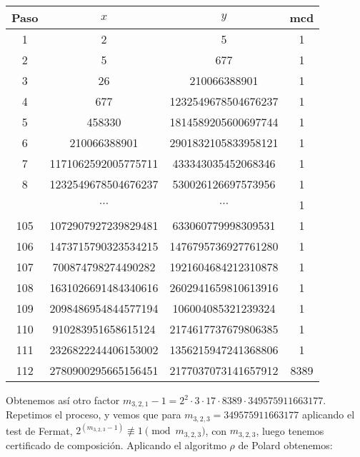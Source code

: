 \documentclass[fleqn]{article}
\begin{document}
    \begin{center}
        \begin{tabular}{| c | c | c | c |}
            \hline Paso & $x$ & $y$ & mcd \\ \hline
            1 & 2 & 5 & 1 \\
            2 & 5 & 677 & 1 \\
            3 & 26 & 210066388901 & 1 \\
            4 & 677 & 1232549678504676237 & 1 \\
            5 & 458330 & 1814589205600697744 & 1 \\
            6 & 210066388901 & 2901832105833958121 & 1 \\
            7 & 1171062592005775711 & 433343035452068346 & 1 \\
            8 & 1232549678504676237 & 530026126697573956 & 1 \\
            & $\cdots$ & $\cdots$ & 1 \\
            105 & 1072907927239829481 & 633060779998309531 & 1 \\
            106 & 1473715790323534215 & 1476795736927761280 & 1 \\
            107 & 700874798274490282 & 1921604684212310878 & 1 \\
            108 & 1631026691484340616 & 2602941659810613916 & 1 \\
            109 & 2098486954844577194 & 106004085321239324 & 1 \\
            110 & 910283951658615124 & 2174617737679806385 & 1 \\
            111 & 2326822244406153002 & 1356215947241368806 & 1 \\
            112 & 2780900295665156451 & 2177037073141657912 & 8389 \\ \hline
        \end{tabular}
    \end{center}
    Obtenemos así otro factor $m_{3,2,1} -1 = 2^2 \cdot 3 \cdot 17 \cdot 8389 \cdot 349575911663177$. Repetimos el proceso, y vemos que para $m_{3,2,3} = 349575911663177$
    aplicando el test de Fermat, $2^{(m_{3,2,3} - 1)} \not\equiv 1 \pmod{m_{3,2,3}}$, con $m_{3,2,3}$, luego tenemos certificado de composición. Aplicando el algoritmo $\rho$ de Polard
    obtenemos:
\end{document}
